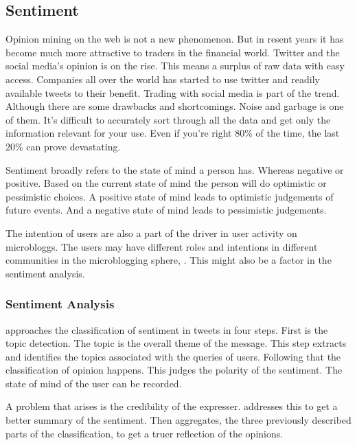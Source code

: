 \subsection{Sentiment}

Opinion mining on the web is not a new phenomenon. But in resent years it has
become much more attractive to traders in the financial world. Twitter and the
social media's opinion is on the rise. This means a surplus of raw data with
easy access. Companies all over the world has started to use twitter and
readily available tweets to their benefit. Trading with social media is part of
the trend. Although there are some drawbacks and shortcomings. Noise and
garbage is one of them. It's difficult to accurately sort through all the data
and get only the information relevant for your use. Even if you're right 80\% of
the time, the last 20\% can prove devastating.
\cite[]{stevenson12:social_media_stock_pickers}

Sentiment broadly refers to the state of mind a person has. Whereas negative or
positive. Based on the current state of mind the person will do optimistic or
pessimistic choices. A positive state of mind leads to optimistic judgements of
future events. And a negative state of mind leads to pessimistic judgements.
\cite[p4]{doukas10:sentiment_and_momentum}

The intention of users are also a part of the driver in user activity on
microbloggs. The users may have different roles and intentions in different
communities in the microblogging sphere, \cite[]{java07}. This might also be a
factor in the sentiment analysis.

\subsubsection{Sentiment Analysis}


\cite[]{Li2013206} approaches the classification of sentiment in tweets in four
steps. First is the topic detection. The topic is the overall theme of the
message. This step extracts and identifies the topics associated with the
queries of users. Following that the classification of opinion happens. This
judges the polarity of the sentiment. The state of mind of the user can be
recorded.

A problem that arises is the credibility of the expresser. \cite[]{Li2013206} addresses this to
get a better summary of the sentiment. Then aggregates, the
three previously described parts of the classification, to get a truer
reflection of the opinions.

